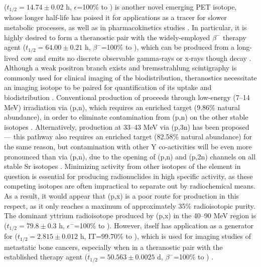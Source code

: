 \documentclass[3p]{elsarticle}
\newcommand{\comment}[1]{\todo[color=blue!20!white,inline]{ASV: #1}}
\begin{document}
 ($t_{1/2}=14.74\pm0.02$ h, $\epsilon$=100\% to   \cite{NEGRET20151}) is another novel  emerging  PET isotope, whose longer half-life has poised it for applications as a tracer for slower metabolic processes, as well as in   pharmacokinetics studies \cite{Valdovinos2017,Nickles2003,Qaim2008,QaimSyedM2011}.
In particular, it is highly desired to form a theranostic pair with the widely-employed $\beta^-$ therapy agent  ($t_{1/2}=64.00\pm0.21$ h, $\beta^-$=100\% to  \cite{Browne1997}), which can be produced from a long-lived  cow and emits no discrete observable gamma-rays or x-rays though decay \cite{Herzog1993}.
Although a weak positron branch exists and bremsstrahlung scintigraphy is commonly used for clinical imaging of the  biodistribution, theranostics  necessitate an imaging isotope to be paired for quantification of its uptake and biodistribution  \cite{Nickles2004}.
Conventional production of  proceeds through low-energy (7--14 MeV) irradiation via (p,n), which requires an enriched   target (9.86\% natural abundance), in order to eliminate contamination from (p,n) on the other stable  isotopes  \cite{Rosch1993}.
Alternatively, production at 33--43 MeV via (p,3n) has been proposed --- this pathway also requires an enriched target (82.58\% natural abundance) for the same reason, but contamination with other Y co-activities will be even more pronounced than via (p,n), due to the opening of (p,n) and (p,2n) channels on all stable Sr isotopes \cite{doi:10.1139/v67-193,levkovski1991cross}.
Minimizing activity from other isotopes of the element in question is essential for producing radionuclides in high specific activity, as these competing isotopes are often impractical to separate out by radiochemical means.
As a result, it would appear that (p,x) is a poor route for   production in this respect, as it only reaches a maximum of approximately 35\% radioisotopic purity.
The  dominant yttrium radioisotope produced by  (p,x) in the 40--90 MeV region is   ($t_{1/2}=79.8\pm0.3$ h, $\epsilon^-$=100\% to  \cite{Johnson2015}).
However,   itself has application as a generator for   ($t_{1/2}=2.815\pm0.012$ h, IT=99.70\% to  \cite{Johnson2015}), which is used for imaging studies of metastatic bone cancers, especially when in a theranostic pair with the established therapy agent  ($t_{1/2}=50.563\pm0.0025$ d, $\beta^-$=100\% to  \cite{Singh2013}) \cite{Kiselev1974,Kandil2009}.
\end{document}
